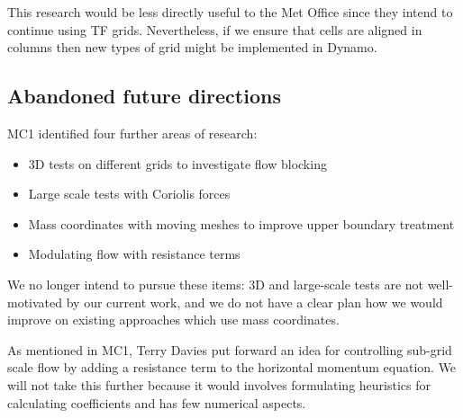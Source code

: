 \documentclass[a4paper]{article}
\begin{document}
This research would be less directly useful to the Met Office since they intend to continue using TF grids.  Nevertheless, if we ensure that cells are aligned in columns then new types of grid might be implemented in Dynamo.

\subsection*{Abandoned future directions}
MC1 identified four further areas of research:
\begin{itemize}
	\item 3D tests on different grids to investigate flow blocking
	\item Large scale tests with Coriolis forces
	\item Mass coordinates with moving meshes to improve upper boundary treatment
	\item Modulating flow with resistance terms
\end{itemize}
We no longer intend to pursue these items: 3D and large-scale tests are not well-motivated by our current work, and we do not have a clear plan how we would improve on existing approaches which use mass coordinates. 

As mentioned in MC1, Terry Davies put forward an idea for controlling sub-grid scale flow by adding a resistance term to the horizontal momentum equation.  We will not take this further because it would involves formulating heuristics for calculating coefficients and has few numerical aspects.
\end{document}
